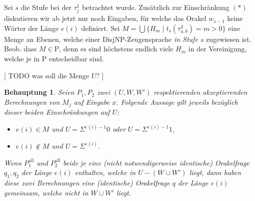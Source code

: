 \documentclass[nofonts]{uebung}
\newtheorem{claim}[theorem]{Behauptung}
\def\P{\ensuremath{\mathrm{P}}}
\begin{document}
Sei $s$ die Stufe bei der $\tau^1_j$ betrachtet wurde.
Zusätzlich zur Einschränkung $(\ast)$ diskutieren wir ab jetzt nur noch Eingaben, für welche das Orakel $w_{s-1}$ keine Wörter der Länge $e(i)$ definiert.
Sei $M=\bigcup \{ H_m \mid t_s(\tau^3_{a,b})=m>0 \}$ eine Menge an Ebenen, welche einer DisjNP-Zeugensprache \emph{in Stufe $s$} zugewiesen ist.
Beob. dass $M\in \P$, denn es sind höchstens endlich viele $H_m$ in der Vereinigung, welche je in $\P$ entscheidbar sind.

[ TODO was soll die Menge $U$? ]


\begin{claim}
    Seien $P_1, P_2$ zwei $(U, W, W')$ respektierenden akzeptierenden Berechnungen von $M_j$ auf Eingabe $x$.
    Folgende Aussage gilt jeweils bezüglich dieser beiden Einschränkungen auf $U$:
    \begin{itemize}[nosep]
        \item $e(i)\in M$ und $U=\Sigma^{e(i)-1}0$ oder $U=\Sigma^{e(i)-1}1$,
        \item $e(i)\not\in M$ und $U=\Sigma^{e(i)}$.
    \end{itemize}

    Wenn $P^\mathrm{all}_1$ und $P^\mathrm{all}_2$ beide je eine (nicht notwendigerweise identische) Orakelfrage $q_1, q_2$ der Länge $e(i)$ enthalten, welche in $U-(W\cup W')$ liegt, dann haben diese zwei Berechnungen eine (identische) Orakelfrage $q$ der Länge $e(i)$ gemeinsam, welche nicht in $W\cup W'$ liegt.
\end{claim}
\end{document}
